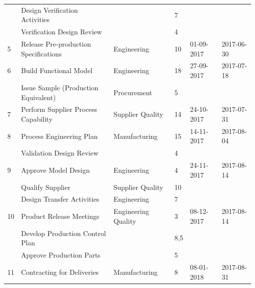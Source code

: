 \begin{landscape}
\begin{table}[H]
{\begin{tabular}{|l|l|l|l|l|l|}
 & Design Verification Activities &  & 7 & \cellcolor[HTML]{9AFF99} & \cellcolor[HTML]{96FFFB} \\ \cline{2-2} \cline{4-4}
 & Verification Design Review &  & 4 & \cellcolor[HTML]{9AFF99} & \cellcolor[HTML]{96FFFB} \\ \cline{2-2} \cline{4-4}
\multirow{-3}{*}{5} & Release Pre-production Specifications & \multirow{-3}{*}{Engineering} & 10 & \multirow{-3}{*}{\cellcolor[HTML]{9AFF99}01-09-2017} & \multirow{-3}{*}{\cellcolor[HTML]{96FFFB}2017-06-30} \\ \hline
6 & Build Functional Model & Engineering & 18 & \cellcolor[HTML]{9AFF99}27-09-2017 & \cellcolor[HTML]{96FFFB}2017-07-18 \\ \hline
 & Issue Sample (Production Equivalent) & Procurement & 5 & \cellcolor[HTML]{9AFF99} & \cellcolor[HTML]{96FFFB} \\ \cline{2-4}
\multirow{-2}{*}{7} & Perform Supplier Process Capability & Supplier Quality & 14 & \multirow{-2}{*}{\cellcolor[HTML]{9AFF99}24-10-2017} & \multirow{-2}{*}{\cellcolor[HTML]{96FFFB}2017-07-31} \\ \hline
8 & Process Engineering Plan & Manufacturing & 15 & \cellcolor[HTML]{9AFF99}14-11-2017 & \cellcolor[HTML]{96FFFB}2017-08-04 \\ \hline
 & Validation Design Review &  & 4 & \cellcolor[HTML]{9AFF99} & \cellcolor[HTML]{96FFFB} \\ \cline{2-2} \cline{4-4}
\multirow{-2}{*}{9} & Approve Model Design & \multirow{-2}{*}{Engineering} & 4 & \multirow{-2}{*}{\cellcolor[HTML]{9AFF99}24-11-2017} & \multirow{-2}{*}{\cellcolor[HTML]{96FFFB}2017-08-14} \\ \hline
 & Qualify Supplier & Supplier Quality & 10 & \cellcolor[HTML]{9AFF99} & \cellcolor[HTML]{96FFFB} \\ \cline{2-4}
 & Design Transfer Activities & Engineering & 7 & \cellcolor[HTML]{9AFF99} & \cellcolor[HTML]{96FFFB} \\ \cline{2-4}
\multirow{-3}{*}{10} & Product Release Meetings & Engineering Quality & 3 & \multirow{-3}{*}{\cellcolor[HTML]{9AFF99}08-12-2017} & \multirow{-3}{*}{\cellcolor[HTML]{96FFFB}2017-08-14} \\ \hline
 & Develop Production Control Plan &  & 8,5 & \cellcolor[HTML]{9AFF99} & \cellcolor[HTML]{96FFFB} \\ \cline{2-2} \cline{4-4}
 & Approve Production Parts &  & 5 & \cellcolor[HTML]{9AFF99} & \cellcolor[HTML]{96FFFB} \\ \cline{2-2} \cline{4-4}
\multirow{-3}{*}{11} & Contracting for Deliveries & \multirow{-3}{*}{Manufacturing} & 8 & \multirow{-3}{*}{\cellcolor[HTML]{9AFF99}08-01-2018} & \multirow{-3}{*}{\cellcolor[HTML]{96FFFB}2017-08-31} \\ \hline

\end{tabular}}
\end{table}
\end{landscape}
